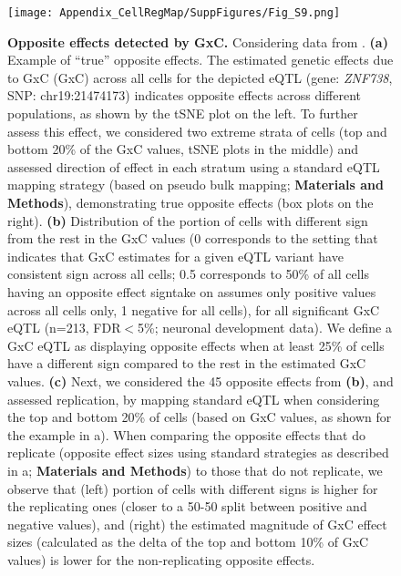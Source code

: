 \begin{figure}[h]
    \centering
    \texttt{[image: Appendix\_CellRegMap/SuppFigures/Fig\_S9.png]}
    \caption{\textbf{Opposite effects detected by GxC.} 
    Considering data from \cite{cuomo2020single}. 
    \textbf{(a)} Example of “true” opposite effects. 
    The estimated genetic effects due to GxC (GxC) across all cells for the depicted eQTL (gene: \textit{ZNF738}, SNP: chr19:21474173) indicates opposite effects across different populations, as shown by the tSNE plot on the left. 
    To further assess this effect, we considered two extreme strata of cells (top and bottom 20\% of the GxC values, tSNE plots in the middle) and assessed direction of effect in each stratum using a standard eQTL mapping strategy (based on pseudo bulk mapping; \textbf{Materials and Methods}), demonstrating true opposite effects (box plots on the right). 
    \textbf{(b)} Distribution of the portion of cells with different sign from the rest in the GxC values (0 corresponds to the setting that indicates that GxC estimates for a given eQTL variant have consistent sign across all cells; 0.5 corresponds to 50\% of all cells having an opposite effect signtake on assumes only positive values across all cells only, 1 negative for all cells), for all significant GxC eQTL (n=213, FDR$<$5\%; neuronal development data). 
    We define a GxC eQTL as displaying opposite effects when at least 25\% of cells have a different sign compared to the rest in the estimated GxC values.
    \textbf{(c)} Next, we considered the 45 opposite effects from \textbf{(b)}, and assessed replication, by mapping standard eQTL when considering the top and bottom 20\% of cells (based on GxC values, as shown for the example in a). 
    When comparing the opposite effects that do replicate (opposite effect sizes using standard strategies as described in a; \textbf{Materials and Methods}) to those that do not replicate, we observe that (left) portion of cells with different signs is higher for the replicating ones (closer to a 50-50 split between positive and negative values), and (right) the estimated magnitude of GxC effect sizes (calculated as the delta of the top and bottom 10\% of GxC values) is lower for the non-replicating opposite effects.
}
\end{figure}

